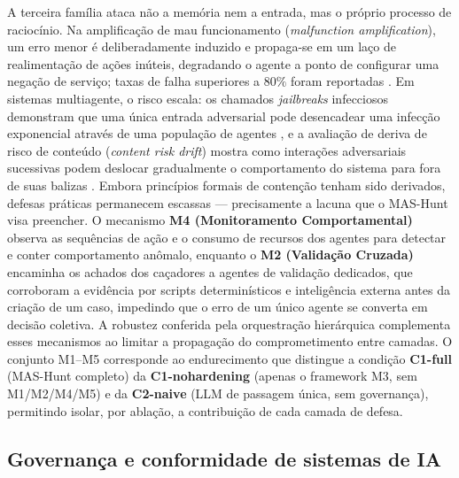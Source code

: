 A terceira família ataca não a memória nem a entrada, mas o próprio processo de raciocínio. Na amplificação de mau funcionamento (\textit{malfunction amplification}), um erro menor é deliberadamente induzido e propaga-se em um laço de realimentação de ações inúteis, degradando o agente a ponto de configurar uma negação de serviço; taxas de falha superiores a $80\%$ foram reportadas \cite{zhang2024breaking}. Em sistemas multiagente, o risco escala: os chamados \textit{jailbreaks} infecciosos demonstram que uma única entrada adversarial pode desencadear uma infecção exponencial através de uma população de agentes \cite{gu2024agent}, e a avaliação de deriva de risco de conteúdo (\textit{content risk drift}) mostra como interações adversariais sucessivas podem deslocar gradualmente o comportamento do sistema para fora de suas balizas \cite{liu2024crda}. Embora princípios formais de contenção tenham sido derivados, defesas práticas permanecem escassas — precisamente a lacuna que o MAS-Hunt visa preencher. O mecanismo \textbf{M4 (Monitoramento Comportamental)} observa as sequências de ação e o consumo de recursos dos agentes para detectar e conter comportamento anômalo, enquanto o \textbf{M2 (Validação Cruzada)} encaminha os achados dos caçadores a agentes de validação dedicados, que corroboram a evidência por scripts determinísticos e inteligência externa antes da criação de um caso, impedindo que o erro de um único agente se converta em decisão coletiva. A robustez conferida pela orquestração hierárquica \cite{huang2024resilience} complementa esses mecanismos ao limitar a propagação do comprometimento entre camadas. O conjunto M1–M5 corresponde ao endurecimento que distingue a condição \textbf{C1-full} (MAS-Hunt completo) da \textbf{C1-nohardening} (apenas o framework M3, sem M1/M2/M4/M5) e da \textbf{C2-naive} (LLM de passagem única, sem governança), permitindo isolar, por ablação, a contribuição de cada camada de defesa.

\subsection{Governança e conformidade de sistemas de IA}
\label{subsec:governanca}

